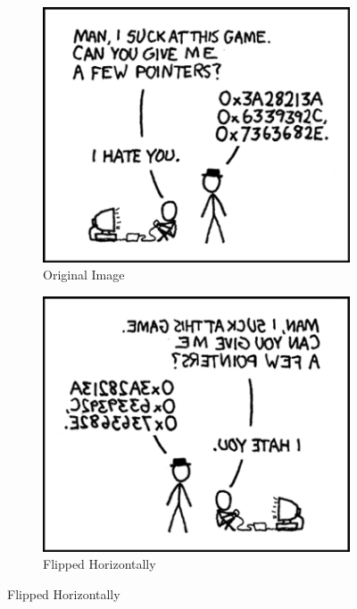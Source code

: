 \documentclass[12pt]{scrartcl}
\begin{document}
\begin{figure}
\centering
\begin{subfigure}{0.4\textwidth}
  \includegraphics[scale=.50]{hack7.0-files/pointers.png}
  \caption{Original Image}
  \label{fig:original}
\end{subfigure}
\hspace*{1cm}
\begin{subfigure}{0.4\textwidth}
  \includegraphics[scale=.50]{hack7.0-files/pointersHFlip}
  \caption{Flipped Horizontally}
  \label{image:pointersHFlip}
\end{subfigure}


\end{figure}
\end{document}
